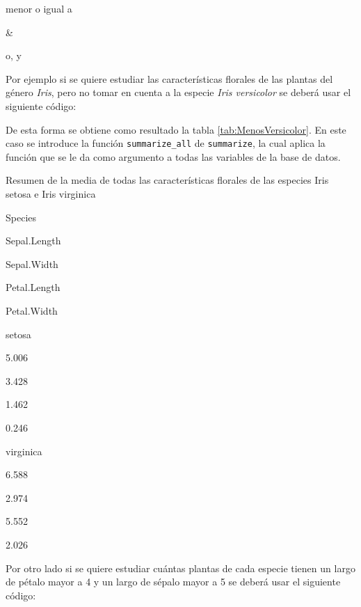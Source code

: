 \documentclass[]{book}
\newenvironment{Shaded}{\begin{snugshade}}{\end{snugshade}}
\newcommand{\DataTypeTok}[1]{\textcolor[rgb]{0.13,0.29,0.53}{#1}}
\newcommand{\DecValTok}[1]{\textcolor[rgb]{0.00,0.00,0.81}{#1}}
\newcommand{\KeywordTok}[1]{\textcolor[rgb]{0.13,0.29,0.53}{\textbf{#1}}}
\newcommand{\NormalTok}[1]{#1}
\newcommand{\OperatorTok}[1]{\textcolor[rgb]{0.81,0.36,0.00}{\textbf{#1}}}
\newcommand{\StringTok}[1]{\textcolor[rgb]{0.31,0.60,0.02}{#1}}
\begin{document}
menor o igual a

\textbar{} \&

o, y

Por ejemplo si se quiere estudiar las características florales de las
plantas del género \emph{Iris}, pero no tomar en cuenta a la especie
\emph{Iris versicolor} se deberá usar el siguiente código:

\begin{Shaded}
\end{Shaded}

De esta forma se obtiene como resultado la tabla
\ref{tab:MenosVersicolor}. En este caso se introduce la función
\texttt{summarize\_all} de \texttt{summarize}, la cual aplica la función
que se le da como argumento a todas las variables de la base de datos.

\label{tab:MenosVersicolor}Resumen de la media de todas las características
florales de las especies Iris setosa e Iris virginica

Species

Sepal.Length

Sepal.Width

Petal.Length

Petal.Width

setosa

5.006

3.428

1.462

0.246

virginica

6.588

2.974

5.552

2.026

Por otro lado si se quiere estudiar cuántas plantas de cada especie
tienen un largo de pétalo mayor a 4 y un largo de sépalo mayor a 5 se
deberá usar el siguiente código:

\begin{Shaded}
\end{Shaded}
\end{document}
